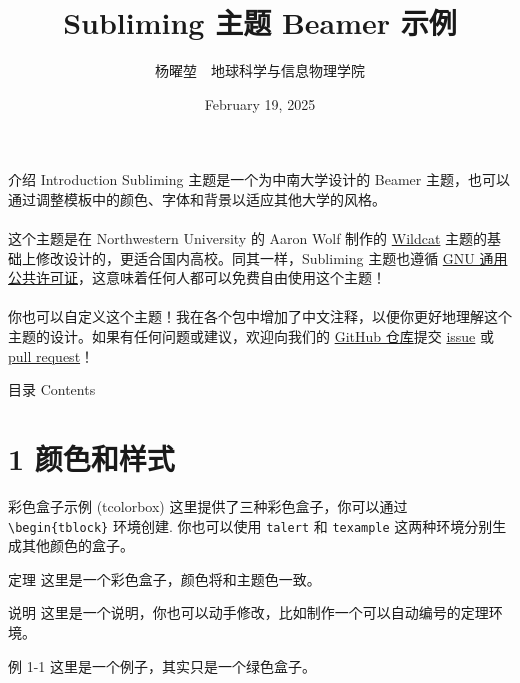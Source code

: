 \documentclass[aspectratio=1610,fontset=none]{ctexbeamer}
\title{Subliming 主题 Beamer 示例}
\author{杨曜堃\ \ 地球科学与信息物理学院}
\date{February 19, 2025}
\begin{document}
    \begin{frame}
        \titlepage
    \end{frame}

    \begin{frame}{介绍 Introduction}
        Subliming 主题是一个为中南大学设计的 Beamer 主题，也可以通过调整模板中的颜色、字体和背景以适应其他大学的风格。 
        \\ ~ \\
        这个主题是在 Northwestern University 的 Aaron Wolf 制作的 \href{https://github.com/aarondwolf/wildcatwildcat}{Wildcat} 主题的基础上修改设计的，更适合国内高校。同其一样，Subliming 主题也遵循 \href{http://www.gnu.org/licenses/}{GNU 通用公共许可证}，这意味着任何人都可以免费自由使用这个主题！
        \\ ~ \\
        你也可以自定义这个主题！我在各个包中增加了中文注释，以便你更好地理解这个主题的设计。如果有任何问题或建议，欢迎向我们的 \href{https://github.com/PourRevenir/Subliming}{GitHub 仓库}提交 \href{https://github.com/PourRevenir/Subliming/issues}{issue} 或 \href{https://github.com/PourRevenir/Subliming/pulls}{pull request}！
    \end{frame}

    \begin{frame}{目录 Contents}
        \tableofcontents
    \end{frame}

    \section{1 颜色和样式}

    \begin{frame}{彩色盒子示例 (tcolorbox)}
        这里提供了三种彩色盒子，你可以通过 \texttt{\textbackslash begin\{tblock\}} 环境创建. 你也可以使用 \texttt{talert} 和 \texttt{texample} 这两种环境分别生成其他颜色的盒子。
        \begin{tblock}{定理}
            这里是一个彩色盒子，颜色将和主题色一致。
        \end{tblock}
        \begin{talert}{说明}
            这里是一个说明，你也可以动手修改，比如制作一个可以自动编号的定理环境。
        \end{talert}
        \begin{texample}{例 1-1}
            这里是一个例子，其实只是一个绿色盒子。
        \end{texample}
    \end{frame}
\end{document}
